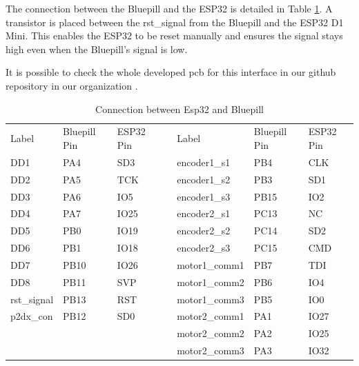 \documentclass[../../../monografia.tex]{subfiles}
\begin{document}
The connection between the Bluepill and the ESP32 is detailed in Table \ref{table: Connection between Esp32 and Bluepill}. A transistor is placed between the rst\_signal from the Bluepill and the ESP32 D1 Mini. This enables the ESP32 to be reset manually and ensures the signal stays high even when the Bluepill’s signal is low.

It is possible to check the whole developed pcb for this interface in our github repository in our organization \cite{pioneer_2dx_interface_pcb_2024}.

\begin{table}[h!]
\caption{Connection between Esp32 and Bluepill}
\begin{tabular}{|l|l|l|l|l|l|l|}
\cline{1-3} \cline{5-7}
Label       & Bluepill Pin & ESP32 Pin &  & Label         & Bluepill Pin & ESP32 Pin \\ \cline{1-3} \cline{5-7} 
DD1         & PA4          & SD3       &  & encoder1\_s1  & PB4          & CLK       \\ \cline{1-3} \cline{5-7} 
DD2         & PA5          & TCK       &  & encoder1\_s2  & PB3          & SD1       \\ \cline{1-3} \cline{5-7} 
DD3         & PA6          & IO5       &  & encoder1\_s3  & PB15         & IO2       \\ \cline{1-3} \cline{5-7} 
DD4         & PA7          & IO25      &  & encoder2\_s1  & PC13         & NC        \\ \cline{1-3} \cline{5-7} 
DD5         & PB0          & IO19      &  & encoder2\_s2  & PC14         & SD2       \\ \cline{1-3} \cline{5-7} 
DD6         & PB1          & IO18      &  & encoder2\_s3  & PC15         & CMD       \\ \cline{1-3} \cline{5-7} 
DD7         & PB10         & IO26      &  & motor1\_comm1 & PB7          & TDI       \\ \cline{1-3} \cline{5-7} 
DD8         & PB11         & SVP       &  & motor1\_comm2 & PB6          & IO4       \\ \cline{1-3} \cline{5-7} 
rst\_signal & PB13         & RST       &  & motor1\_comm3 & PB5          & IO0       \\ \cline{1-3} \cline{5-7} 
p2dx\_con   & PB12         & SD0       &  & motor2\_comm1 & PA1          & IO27      \\ \cline{1-3} \cline{5-7} 
            &              &           &  & motor2\_comm2 & PA2          & IO25      \\ \cline{1-3} \cline{5-7} 
            &              &           &  & motor2\_comm3 & PA3          & IO32      \\ \cline{1-3} \cline{5-7} 
\end{tabular}
\label{table: Connection between Esp32 and Bluepill}
\end{table}
\end{document}
